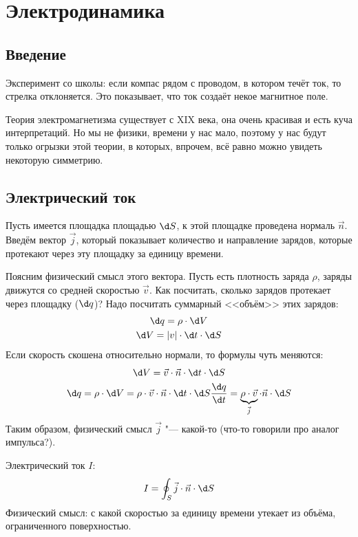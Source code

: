 \chapter{Электродинамика}

\section{Введение}
  Эксперимент со школы: если компас рядом с проводом, в котором течёт ток, то стрелка отклоняется.
  Это показывает, что ток создаёт некое магнитное поле.

  Теория электромагнетизма существует с XIX века, она очень красивая и есть куча интерпретаций.
  Но мы не физики, времени у нас мало, поэтому у нас будут только огрызки этой теории, в которых,
  впрочем, всё равно можно увидеть некоторую симметрию.

\section{Электрический ток}
  Пусть имеется площадка площадью $\d S$, к этой площадке проведена нормаль $\vec n$.
  Введём вектор $\vec j$, который показывает количество и направление зарядов,
  которые протекают через эту площадку за единицу времени.

  Поясним физический смысл этого вектора.
  Пусть есть плотность заряда $\rho$, заряды движутся со средней скоростью $\vec v$.
  Как посчитать, сколько зарядов протекает через площадку ($\d q$)?
  Надо посчитать суммарный <<объём>> этих зарядов:
  \begin{gather*}
    \d q = \rho \cdot \d V \\
    \d V = |v| \cdot \d t \cdot \d S
  \end{gather*}
  Если скорость скошена относительно нормали, то формулы чуть меняются:
  \begin{gather*}
    \d V = \vec v \cdot \vec n \cdot \d t \cdot \d S \\
    \d q = \rho \cdot \d V = \rho \cdot \vec v \cdot \vec n \cdot \d t \cdot \d S
    \frac{\d q}{\d t} = \underbrace{\rho \cdot \vec v}_{\vec j} \cdot \vec n \cdot \d S
  \end{gather*}
  Таким образом, физический смысл $\vec j$ "--- какой-то (что-то говорили про аналог импульса?).

  \begin{Def}
    Электрический ток $I$:
    \[ I = \oint_S \vec j \cdot \vec n \cdot \d S\]
    Физический смысл: с какой скоростью за единицу времени утекает из объёма, ограниченного поверхностью.
  \end{Def}

